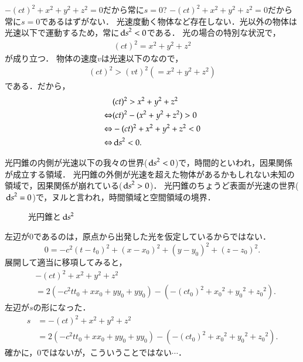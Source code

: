     \begin{memo}{$-(ct)^{2} + {x}^{2} + {y}^{2} + {z}^{2} = 0$だから常に$s=0$?}
        $-(ct)^{2} + {x}^{2} + {y}^{2} + {z}^{2} = 0$だから常に$s=0$であるはずがない．
        光速度動く物体など存在しない．光以外の物体は光速以下で運動するため，常に${\,\mathrm{d} s}^{2}<0$である．
        光の場合の特別な状況で，
        \begin{align}
            (ct)^{2} = {x}^{2} + {y}^{2} + {z}^{2}
        \end{align}
        が成り立つ．
        物体の速度$v$は光速以下のなので，
        \begin{align}
            (ct)^{2} > (vt)^{2} (= {x}^{2} + {y}^{2} + {z}^{2})
        \end{align}
        である．だから，
        \begin{align*}
                            &(ct)^{2} >  {x}^{2} + {y}^{2} + {z}^{2} \\
            \Leftrightarrow &(ct)^{2} - ({x}^{2} + {y}^{2} + {z}^{2}) > 0 \\
            \Leftrightarrow &-(ct)^{2} + {x}^{2} + {y}^{2} + {z}^{2} < 0 \\
            \Leftrightarrow &{\,\mathrm{d} s}^{2} < 0.
        \end{align*}

        光円錐の内側が光速以下の我々の世界(${\,\mathrm{d} s}^{2}<0$)で，時間的といわれ，因果関係が成立する領域．
        光円錐の外側が光速を超えた物体があるかもしれない未知の領域で，因果関係が崩れている(${\,\mathrm{d} s}^{2}>0$)．
        光円錐のちょうど表面が光速の世界(${\,\mathrm{d} s}^{2}=0$)で，ヌルと言われ，時間領域と空間領域の境界．
        \begin{figure}[hbt]
            \begin{center}
                \caption{光円錐と${\,\mathrm{d} s}^{2}$}
                \label{fig:koyuuji1}
            \end{center}
        \end{figure}


        左辺が0であるのは，原点から出発した光を仮定しているからではない．
            \[
                0 = -{c}^{2}(t-{t}_{0})^{2} + {(x-{x}_{0})}^{2} + {(y-{y}_{0})}^{2} + {(z-{z}_{0})}^{2}.
            \]
        展開して適当に移項してみると，
            \begin{align*}
                &-{(ct)}^{2} + {x}^{2} + {y}^{2} + {z}^{2} \\
                &= 2(-{c}^{2}t{t}_{0}+x{x}_{0}+y{y}_{0}+y{y}_{0})
                -(-{(c{t}_{0})}^{2} + {{x}_{0}}^{2} + {{y}_{0}}^{2} + {{z}_{0}}^{2}).
            \end{align*}
        左辺が$s$の形になった．
            \begin{align*}
                s &= -{(ct)}^{2} + {x}^{2} + {y}^{2} + {z}^{2} \\
                  &= 2(-{c}^{2}t{t}_{0}+x{x}_{0}+y{y}_{0}+y{y}_{0})
                  - (-{(c{t}_{0})}^{2} + {{{x}_{0}}^{2}} + {{{y}_{0}}^{2}} + {{{z}_{0}}^{2}}).
            \end{align*}
        確かに，0ではないが，こういうことではない$\cdots$．
    \end{memo}

